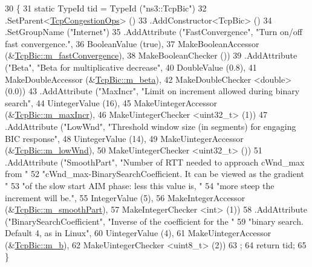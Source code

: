 \begin{DoxyCode}
30 \{
31   \textcolor{keyword}{static} TypeId tid = TypeId (\textcolor{stringliteral}{"ns3::TcpBic"})
32     .SetParent<\hyperlink{classns3_1_1TcpCongestionOps_a044982d009b94a2bbf59ed27cdb14e91}{TcpCongestionOps}> ()
33     .AddConstructor<TcpBic> ()
34     .SetGroupName (\textcolor{stringliteral}{"Internet"})
35     .AddAttribute (\textcolor{stringliteral}{"FastConvergence"}, \textcolor{stringliteral}{"Turn on/off fast convergence."},
36                    BooleanValue (\textcolor{keyword}{true}),
37                    MakeBooleanAccessor (&\hyperlink{classns3_1_1TcpBic_a034d8e16b688a2c58b5d2213aa5c3b7b}{TcpBic::m\_fastConvergence}),
38                    MakeBooleanChecker ())
39     .AddAttribute (\textcolor{stringliteral}{"Beta"}, \textcolor{stringliteral}{"Beta for multiplicative decrease"},
40                    DoubleValue (0.8),
41                    MakeDoubleAccessor (&\hyperlink{classns3_1_1TcpBic_a899269934e13c92129fec020cc09256e}{TcpBic::m\_beta}),
42                    MakeDoubleChecker <double> (0.0))
43     .AddAttribute (\textcolor{stringliteral}{"MaxIncr"}, \textcolor{stringliteral}{"Limit on increment allowed during binary search"},
44                    UintegerValue (16),
45                    MakeUintegerAccessor (&\hyperlink{classns3_1_1TcpBic_a79db4e8443cc0a27388a80566327a5a0}{TcpBic::m\_maxIncr}),
46                    MakeUintegerChecker <uint32\_t> (1))
47     .AddAttribute (\textcolor{stringliteral}{"LowWnd"}, \textcolor{stringliteral}{"Threshold window size (in segments) for engaging BIC response"},
48                    UintegerValue (14),
49                    MakeUintegerAccessor (&\hyperlink{classns3_1_1TcpBic_a1a7a6a7c186075fba672ff3328eb85ec}{TcpBic::m\_lowWnd}),
50                    MakeUintegerChecker <uint32\_t> ())
51     .AddAttribute (\textcolor{stringliteral}{"SmoothPart"}, \textcolor{stringliteral}{"Number of RTT needed to approach cWnd\_max from "}
52                    \textcolor{stringliteral}{"cWnd\_max-BinarySearchCoefficient. It can be viewed as the gradient "}
53                    \textcolor{stringliteral}{"of the slow start AIM phase: less this value is, "}
54                    \textcolor{stringliteral}{"more steep the increment will be."},
55                    IntegerValue (5),
56                    MakeIntegerAccessor (&\hyperlink{classns3_1_1TcpBic_a69437c77ce1d0e51238f51c262d58bf1}{TcpBic::m\_smoothPart}),
57                    MakeIntegerChecker <int> (1))
58     .AddAttribute (\textcolor{stringliteral}{"BinarySearchCoefficient"}, \textcolor{stringliteral}{"Inverse of the coefficient for the "}
59                    \textcolor{stringliteral}{"binary search. Default 4, as in Linux"},
60                    UintegerValue (4),
61                    MakeUintegerAccessor (&\hyperlink{classns3_1_1TcpBic_a3f94d435d1b4821077da9acb72fd8d5f}{TcpBic::m\_b}),
62                    MakeUintegerChecker <uint8\_t> (2))
63   ;
64   \textcolor{keywordflow}{return} tid;
65 \}
\end{DoxyCode}


